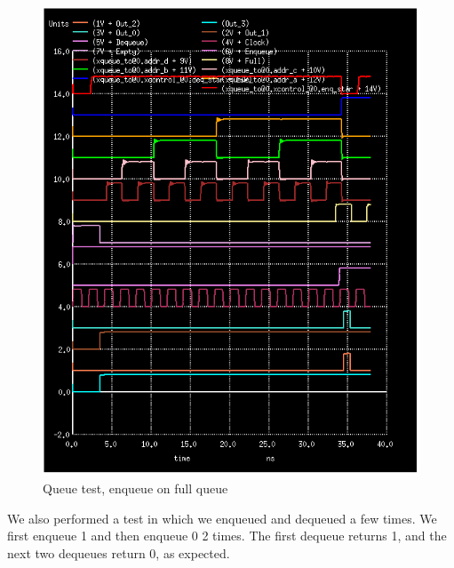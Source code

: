 \documentclass[12pt]{report}
\begin{document}
\begin{figure}[H]
  \centering
    \includegraphics[width=1.0\textwidth]{queue_toplevel_test_enq_when_full.PNG}
  \caption{Queue test, enqueue on full queue}
\end{figure}

We also performed a test in which we enqueued and dequeued a few times. We first enqueue 1 and then enqueue 0 2 times. The first dequeue returns 1, and the next two dequeues return 0, as expected.
\end{document}
